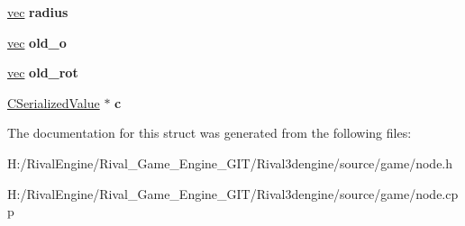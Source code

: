 \begin{DoxyCompactItemize}
\hyperlink{structvec}{vec} {\bfseries radius}
\item 
\mbox{\label{structnode_a6164fdc9b321a82e8d9ba9f47908b194}} 
\hyperlink{structvec}{vec} {\bfseries old\+\_\+o}
\item 
\mbox{\label{structnode_a75f44e3292cb4ed17cd93544ffd80ee9}} 
\hyperlink{structvec}{vec} {\bfseries old\+\_\+rot}
\item 
\mbox{\label{structnode_a5b4ccd8ea20c32a4965409a4813500c6}} 
\hyperlink{class_c_serialized_value}{C\+Serialized\+Value} $\ast$ {\bfseries c}
\end{DoxyCompactItemize}


The documentation for this struct was generated from the following files\+:\begin{DoxyCompactItemize}
\item 
H\+:/\+Rival\+Engine/\+Rival\+\_\+\+Game\+\_\+\+Engine\+\_\+\+G\+I\+T/\+Rival3dengine/source/game/node.\+h\item 
H\+:/\+Rival\+Engine/\+Rival\+\_\+\+Game\+\_\+\+Engine\+\_\+\+G\+I\+T/\+Rival3dengine/source/game/node.\+cpp\end{DoxyCompactItemize}
